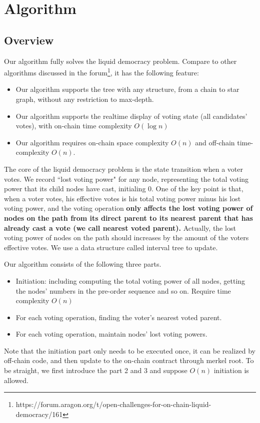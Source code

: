 \section{Algorithm}
\subsection{Overview}
Our algorithm fully solves the liquid democracy problem. Compare to other algorithms discussed in the forum\footnote{https://forum.aragon.org/t/open-challenges-for-on-chain-liquid-democracy/161}, it has the following feature:
\begin{itemize}
	\item Our algorithm supports the tree with any structure, from a chain to star graph, without any restriction to max-depth.
	\item Our algorithm supports the realtime display of voting state (all candidates' votes), with on-chain time complexity $O(\log n)$
	\item Our algorithm requires on-chain space complexity $O(n)$ and off-chain time-complexity $O(n)$.
\end{itemize}
The core of the liquid democracy problem is the state transition when a voter votes. We record ``lost voting power" for any node, representing the total voting power that its child nodes have cast, initialing 0.  One of the key point is that, when a voter votes, his effective votes is his total voting power minus his lost voting power, and the voting operation \textbf{only affects the lost voting power of nodes on the path from its direct parent to its nearest parent that has already cast a vote (we call nearest voted parent).} Actually, the lost voting power of nodes on the path should increases by the amount of the voters effective votes. We use a data structure called interval tree to update.

Our algorithm consists of the following three parts. 
\begin{itemize}
	\item Initiation: including computing the total voting power of all nodes, getting the nodes' numbers in the pre-order sequence and so on. Require time complexity $O(n)$
	\item For each voting operation, finding the voter's nearest voted parent.
	\item For each voting operation, maintain nodes' lost voting powers. 
\end{itemize}

Note that the initiation part only needs to be executed once, it can be realized by off-chain code, and then update to the on-chain contract through merkel root. To be straight, we first introduce the part 2 and 3 and suppose $O(n)$ initiation is allowed.

